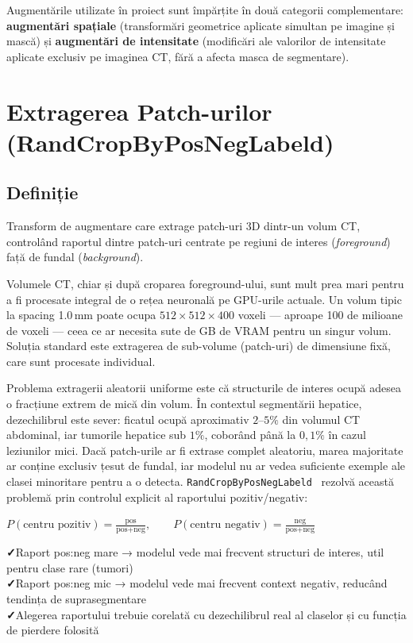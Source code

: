 \documentclass[12pt, a4paper]{report}
\newcommand{\pro}{\textcolor{accentgreen}{\textbf{✓}}\;}
\newcommand{\formula}[1]{%
    \begin{center}
        \colorbox{codebackground}{%
            \parbox{0.88\textwidth}{\centering\vspace{4pt}$#1$\vspace{4pt}}%
        }
    \end{center}
}
\begin{document}
Augmentările utilizate în proiect sunt împărțite în două categorii complementare:
\textbf{augmentări spațiale} (transformări geometrice aplicate simultan pe imagine și mască)
și \textbf{augmentări de intensitate} (modificări ale valorilor de intensitate aplicate
exclusiv pe imaginea CT, fără a afecta masca de segmentare). 

\section{Extragerea Patch-urilor (RandCropByPosNegLabeld)}
\label{sec:randcrop}

\subsection{Definiție}

\vspace{4pt}
\begin{infobox}
Transform de augmentare care extrage patch-uri 3D dintr-un volum CT,
controlând raportul dintre patch-uri centrate pe regiuni de interes
(\textit{foreground}) față de fundal (\textit{background}).
\end{infobox}

Volumele CT, chiar și după croparea foreground-ului, sunt mult prea mari pentru a fi procesate
integral de o rețea neuronală pe GPU-urile actuale. Un volum tipic la spacing 1.0\,mm
poate ocupa $512 \times 512 \times 400$ voxeli — aproape 100 de milioane de voxeli —
ceea ce ar necesita sute de GB de VRAM pentru un singur volum. Soluția standard este
extragerea de sub-volume (patch-uri) de dimensiune fixă, care sunt procesate individual.

Problema extragerii aleatorii uniforme este că structurile de interes ocupă
adesea o fracțiune extrem de mică din volum. În contextul segmentării hepatice, dezechilibrul este sever:
ficatul ocupă aproximativ $2$--$5\%$ din volumul CT abdominal,
iar tumorile hepatice sub $1\%$, coborând până la $0{,}1\%$
în cazul leziunilor mici. Dacă patch-urile ar fi extrase
complet aleatoriu, marea majoritate ar conține exclusiv țesut de fundal, iar
modelul nu ar vedea suficiente exemple ale clasei minoritare pentru a o detecta.
\texttt{RandCropByPosNegLabeld}~\cite{isensee2019automated, cardoso2022monai} rezolvă această problemă prin controlul explicit
al raportului pozitiv/negativ:

\formula{
    P(\text{centru pozitiv}) = \frac{\text{pos}}{\text{pos} + \text{neg}}, \qquad
    P(\text{centru negativ}) = \frac{\text{neg}}{\text{pos} + \text{neg}}
}
\begin{goodbox}
\pro Raport pos:neg mare → modelul vede mai frecvent structuri de interes,
     util pentru clase rare (tumori) \\
\pro Raport pos:neg mic → modelul vede mai frecvent context negativ, reducând
     tendința de suprasegmentare \\
\pro Alegerea raportului trebuie corelată cu dezechilibrul real al claselor
     și cu funcția de pierdere folosită
\end{goodbox}
\end{document}
